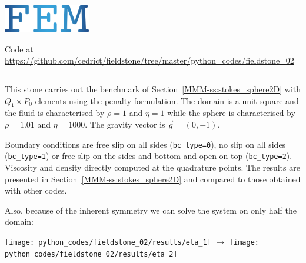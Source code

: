 \includegraphics[height=1.25cm]{images/pictograms/FEM}






\begin{center}
Code at \url{https://github.com/cedrict/fieldstone/tree/master/python_codes/fieldstone_02}
\end{center}

\par\noindent\rule{\textwidth}{0.4pt}

This stone carries out the benchmark of Section~\ref{MMM-ss:stokes_sphere2D}
with $Q_1\times P_0$ elements using the penalty formulation.
The domain is a unit square and the fluid is characterised 
by $\rho=1$ and $\eta=1$ 
while the sphere is characterised 
by $\rho=1.01$ and $\eta=1000$.
The gravity vector is $\vec{g}=(0,-1)$. 

Boundary conditions are free slip on all sides ({\tt bc\_type=0}), 
no slip on all sides ({\tt bc\_type=1}) or free slip on the sides and bottom and open 
on top ({\tt bc\_type=2}).
Viscosity and density directly computed at the quadrature points.
The results are presented in Section~\ref{MMM-ss:stokes_sphere2D} and compared to 
those obtained with other codes.

Also, because of the inherent symmetry we can solve the system 
on only half the domain:
\begin{center}
\texttt{[image: python\_codes/fieldstone\_02/results/eta\_1]}
$\rightarrow$
\texttt{[image: python\_codes/fieldstone\_02/results/eta\_2]}
\end{center}


